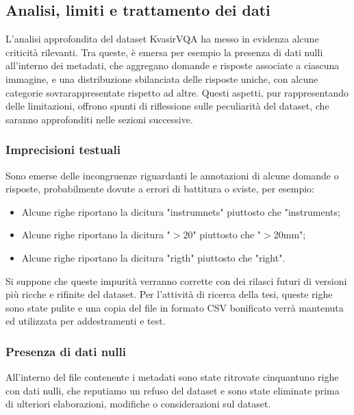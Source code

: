 \documentclass[../main.tex]{subfiles}
\begin{document}
\subsection{Analisi, limiti e trattamento dei dati}

L'analisi approfondita del dataset KvasirVQA ha messo in evidenza alcune criticità rilevanti. Tra queste, è emersa per esempio la presenza di dati nulli all'interno dei metadati, che aggregano domande e risposte associate a ciascuna immagine, e una distribuzione sbilanciata delle risposte uniche, con alcune categorie sovrarappresentate rispetto ad altre. 
Questi aspetti, pur rappresentando delle limitazioni, offrono spunti di riflessione sulle peculiarità del dataset, che saranno approfonditi nelle sezioni successive.

\subsubsection{Imprecisioni testuali}

Sono emerse delle incongruenze riguardanti le annotazioni di alcune domande o risposte, probabilmente dovute a errori di battitura o sviste, per esempio:

\begin{itemize}
    \item Alcune righe riportano la dicitura "instrumnets" piuttosto che "instruments;
    \item Alcune righe riportano la dicitura "$>$20" piuttosto che "$>$20mm";
    \item Alcune righe riportano la dicitura "rigth" piuttosto che "right".
\end{itemize}

Si suppone che queste impurità verranno corrette con dei rilasci futuri di versioni più ricche e rifinite del dataset. 
Per l'attività di ricerca della tesi, queste righe sono state pulite e una copia del file in formato CSV bonificato verrà mantenuta ed utilizzata per addestramenti e test.

\subsubsection{Presenza di dati nulli}

All'interno del file contenente i metadati sono state ritrovate cinquantuno righe con dati nulli, che reputiamo un refuso del dataset e sono state eliminate prima di ulteriori elaborazioni, modifiche o considerazioni sul dataset. 
\end{document}
